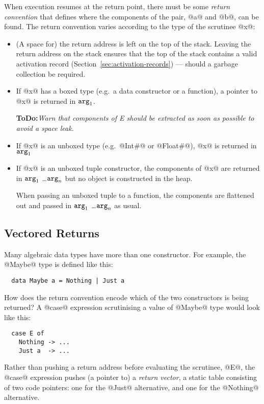 \documentclass[11pt]{article}
\newcommand{\ToDo}[1]{{{\bf ToDo:}\sl #1}}
\newcommand{\Arg}[1]{\mbox{${\tt arg}_{#1}$}}
\newcommand{\secref}[1]{Section~\ref{sec:#1}}
\newcommand{\Subsection}[2]{\subsection{#1}\label{sec:#2}}
\begin{document}
When execution resumes at the return point, there must be some {\em
return convention} that defines where the components of the pair, @a@
and @b@, can be found.  The return convention varies according to the
type of the scrutinee @x@:

\begin{itemize}

\item 

(A space for) the return address is left on the top of the stack.
Leaving the return address on the stack ensures that the top of the
stack contains a valid activation record
(\secref{activation-records}) --- should a garbage
collection be required.

\item If @x@ has a boxed type (e.g.~a data constructor or a function),
a pointer to @x@ is returned in \Arg{1}.

\ToDo{Warn that components of E should be extracted as soon as
possible to avoid a space leak.}

\item If @x@ is an unboxed type (e.g.~@Int#@ or @Float#@), @x@ is
returned in \Arg{1}

\item If @x@ is an unboxed tuple constructor, the components of @x@
are returned in \Arg{1} \ldots \Arg{n} but no object is constructed in
the heap.  

When passing an unboxed tuple to a function, the components are
flattened out and passed in \Arg{1} \ldots \Arg{n} as usual.

\end{itemize}

\Subsection{Vectored Returns}{vectored-returns}

Many algebraic data types have more than one constructor.  For
example, the @Maybe@ type is defined like this:
\begin{verbatim}
  data Maybe a = Nothing | Just a
\end{verbatim}
How does the return convention encode which of the two constructors is
being returned?  A @case@ expression scrutinising a value of @Maybe@
type would look like this: 
\begin{verbatim}
  case E of 
    Nothing -> ...
    Just a  -> ...
\end{verbatim}
Rather than pushing a return address before evaluating the scrutinee,
@E@, the @case@ expression pushes (a pointer to) a \emph{return
vector}, a static table consisting of two code pointers: one for the
@Just@ alternative, and one for the @Nothing@ alternative.  
\end{document}

